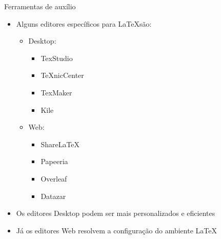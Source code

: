 \begin{frame}{Ferramentas de auxílio}
    
    \begin{itemize}
        \item Alguns editores específicos para \LaTeX são:
        \begin{itemize}
            \item Desktop:
            \begin{itemize}
                \item TexStudio
                \item TeXnicCenter
                \item TexMaker
                \item Kile
            \end{itemize}
            \item Web:
                \begin{itemize}
                \item Share\LaTeX
                \item Papeeria
                \item Overleaf
                \item Datazar
            \end{itemize}
        \end{itemize}
        \item Os editores Desktop podem ser mais personalizados e eficientes 
        \item Já os editores Web resolvem a configuração do ambiente \LaTeX
         
    \end{itemize}
\end{frame}

